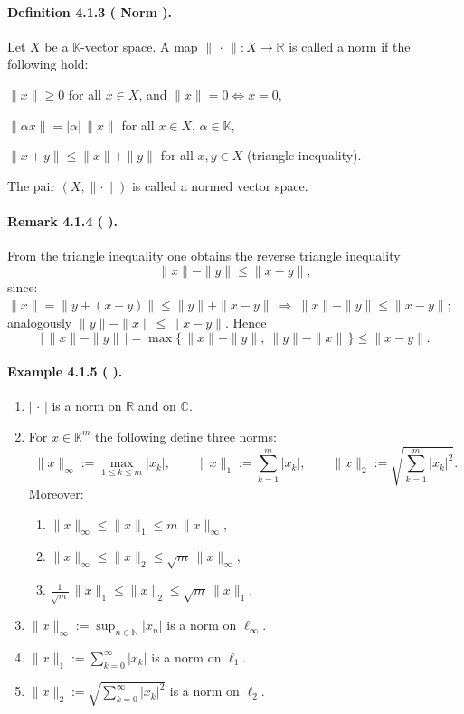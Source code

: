 \documentclass[12pt,a4paper]{article}
\newcommand{\N}{\mathbb{N}}
\newcommand{\R}{\mathbb{R}}
\newcommand{\C}{\mathbb{C}}
\newcommand{\K}{\mathbb{K}} %
\newcommand{\NumberedDefinition}[3]{%
\paragraph*{Definition #1 ( #2 ).} #3\par}
\newcommand{\NumberedExample}[3]{%
\paragraph*{Example #1 ( #2 ).} #3\par}
\newcommand{\NumberedRemark}[3]{%
\paragraph*{Remark #1 ( #2 ).} #3\par}
\theoremstyle{plain}
\theoremstyle{definition}
\theoremstyle{remark}
\begin{document}
\NumberedDefinition{4.1.3}{Norm}{Let $X$ be a $\K$-vector space. A map $\|\,\cdot\,\| : X\to\R$ is called a norm if the following hold:
\begin{description}[leftmargin=*]
	\item[N1] $\|x\|\ge 0$ for all $x\in X$, \quad and \quad $\|x\|=0 \iff x=0$,
	\item[N2] $\|\alpha x\| = |\alpha|\,\|x\|$ for all $x\in X$, $\alpha\in\K$,
	\item[N3] $\|x+y\| \le \|x\| + \|y\|$ for all $x,y\in X$ (triangle inequality).
\end{description}
The pair $(X,\|\cdot\|)$ is called a normed vector space.}

\NumberedRemark{4.1.4}{}{From the triangle inequality one obtains the reverse triangle inequality
\[
	\|x\| - \|y\| \le \|x-y\|,
\]
since: $\|x\| = \|y + (x-y)\| \le \|y\| + \|x-y\| \ \Rightarrow\ \|x\| - \|y\| \le \|x-y\|$; analogously $\|y\| - \|x\| \le \|x-y\|$. Hence
\[
	\big|\,\|x\| - \|y\|\,\big| = \max\{\,\|x\| - \|y\|,\ \|y\| - \|x\|\,\} \le \|x-y\|.
\]}

\NumberedExample{4.1.5}{}{\begin{enumerate}[label={(\arabic*)}, leftmargin=*]
	\item $|\,\cdot\,|$ is a norm on $\R$ and on $\C$.

	\item For $x\in\K^{m}$ the following define three norms:
	\[
		\|x\|_{\infty} := \max_{1\le k\le m} |x_k|, \qquad
		\|x\|_{1} := \sum_{k=1}^{m} |x_k|, \qquad
		\|x\|_{2} := \sqrt{\sum_{k=1}^{m} |x_k|^{2}}.
	\]
	Moreover:
	\begin{enumerate}[label=\roman*.), leftmargin=2em]
		\item $\|x\|_{\infty} \le \|x\|_{1} \le m\,\|x\|_{\infty}$,
		\item $\|x\|_{\infty} \le \|x\|_{2} \le \sqrt{m}\,\|x\|_{\infty}$,
		\item $\tfrac{1}{\sqrt{m}}\,\|x\|_{1} \le \|x\|_{2} \le \sqrt{m}\,\|x\|_{1}$.
	\end{enumerate}

	\item $\displaystyle \|x\|_{\infty} := \sup_{n\in\N} |x_n|$ is a norm on $\ell_{\infty}$.

	\item $\displaystyle \|x\|_{1} := \sum_{k=0}^{\infty} |x_k|$ is a norm on $\ell_{1}$.

	\item $\displaystyle \|x\|_{2} := \sqrt{\sum_{k=0}^{\infty} |x_k|^{2}}$ is a norm on $\ell_{2}$.
\end{enumerate}}
\end{document}
